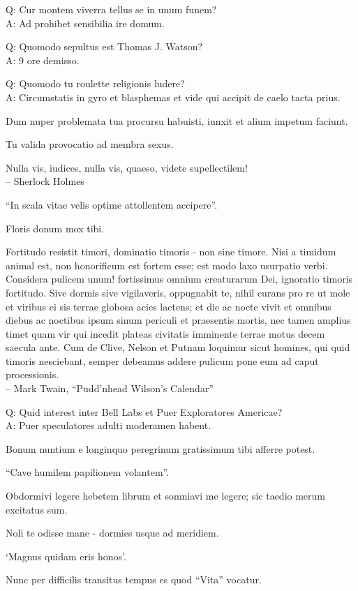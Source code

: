 \documentclass[titlepage,12pt]{memoir}
\begin{document}
Q: Cur montem viverra tellus se in unum funem?\\
A: Ad prohibet sensibilia ire domum.

Q: Quomodo sepultus est Thomas J. Watson?\\
A: 9 ore demisso.

Q: Quomodo tu roulette religionis ludere?\\
A: Circumstatis in gyro et blasphemas et vide qui accipit
de caelo tacta prius.

Dum nuper problemata tua procursu habuisti, iunxit et
alium impetum faciunt.

Tu valida provocatio ad membra sexus.

Nulla vis, iudices, nulla vis, quaeso, videte supellectilem!
\\-- Sherlock Holmes

“In scala vitae velis optime attollentem accipere”.

Floris donum mox tibi.

Fortitudo resistit timori, dominatio timoris - non sine timore. Nisi a
timidum animal est, non honorificum est fortem esse; est modo
laxo usurpatio verbi. Considera pulicem unum!
fortissimus omnium creaturarum Dei, ignoratio timoris fortitudo.
Sive dormis sive vigilaveris, oppugnabit te, nihil curans pro re
ut mole et viribus ei sis terrae globosa acies
lactens; et die ac nocte vivit et omnibus diebus ac noctibus
ipsum sinum periculi et praesentis mortis, nec tamen amplius
timet quam vir qui incedit plateas civitatis imminente
terrae motus decem saecula ante. Cum de Clive, Nelson et Putnam loquimur
sicut homines, qui quid timoris nesciebant, semper debeamus addere pulicum
pone eum ad caput processionis.
\\-- Mark Twain, “Pudd’nhead Wilson’s Calendar”

Q: Quid interest inter Bell Labs et Puer Exploratores Americae?\\
A: Puer speculatores adulti moderamen habent.

Bonum nuntium e longinquo peregrinum gratissimum tibi afferre potest.

“Cave humilem papilionem volantem”.

Obdormivi legere hebetem librum et somniavi me legere;
sic taedio merum excitatus sum.

Noli te odisse mane - dormies usque ad meridiem.

‘Magnus quidam eris honos’.

Nunc per difficilis transitus tempus es quod “Vita” vocatur.
\end{document}
